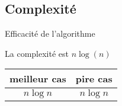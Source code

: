 \begin{exemple2}


\begin{center}
		
\end{center}


\end{exemple2}

%
%
\subsection{Complexité}
%
%
%
%
%
\begin{prop}{Efficacité de l'algorithme}

La complexité est \textbf{$n\log(n)$}

\begin{center}
\begin{tabular}{|c|c|}
\hline 
 meilleur cas &  pire cas \\ 
\hline 
$n \log n$ & $n \log n$ \\ 
\hline 
\end{tabular} 
\end{center}

\end{prop}




